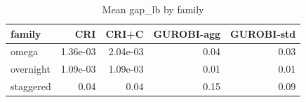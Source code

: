\begin{table}[htbp]
\centering
\small
\caption{Mean gap\_lb by family}
\label{tab:E3x_long_runs_xlarge_b600_by_family}
\begin{tabular}{lrrrr}
\toprule
family & CRI & CRI+C & GUROBI-agg & GUROBI-std \\
\midrule
omega & 1.36e-03 & 2.04e-03 & 0.04 & 0.03 \\
overnight & 1.09e-03 & 1.09e-03 & 0.01 & 0.01 \\
staggered & 0.04 & 0.04 & 0.15 & 0.09 \\
\bottomrule
\end{tabular}
\end{table}
